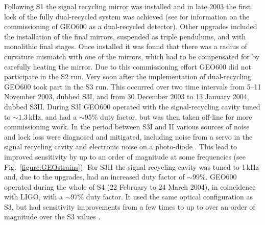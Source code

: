 \documentclass{article}
\begin{document}

Following S1 the signal recycling mirror was installed and in late 2003 the
first lock of the fully dual-recycled system was achieved (see
\cite{Smith:2004, Willke:2004, Grote:2005} for information on the commissioning
of GEO600 as a dual-recycled detector). Other upgrades included the
installation of the final mirrors, suspended as triple pendulums, and with
monolithic final stages. Once installed it was found that there was a radius of
curvature mismatch with one of the mirrors, which had to be compensated for by
carefully heating the mirror. Due to this commissioning effort GEO600 did not
participate in the S2 run. Very soon after the implementation of dual-recycling
GEO600 took part in the S3 run. This occurred over two time intervals from
5--11 November 2003, dubbed S3I, and from 30 December 2003 to 13 January 2004,
dubbed S3II. During S3I GEO600 operated with the signal-recycling cavity tuned
to $\sim 1.3$\,kHz, and had a $\sim$95\% duty factor, but was then taken
off-line for more commissioning work. In the period between S3I and II various
sources of noise and lock loss were diagnosed and mitigated, including noise
from a servo in the signal recycling cavity and electronic noise on a
photo-diode \cite{Smith:2004}. This lead to improved sensitivity by up to an
order of magnitude at some frequencies (see Fig.~\ref{figure:GEOstrains}). For
S3II the signal recycling cavity was tuned to 1\,kHz and, due to the upgrades,
had an increased duty factor of $\sim$99\%. GEO600 operated during the whole of
S4 (22 February to 24 March 2004), in coincidence with LIGO, with a $\sim$97\%
duty factor. It used the same optical configuration as S3, but had sensitivity
improvements from a few times to up to over an order of magnitude over the S3
values \cite{Hild:2006a}.
\end{document}
